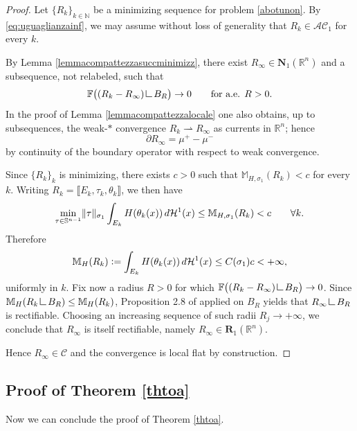 \documentclass{article}
\numberwithin{equation}{section}
\theoremstyle{plain}%
\theoremstyle{definition}
\theoremstyle{definition}
\newcommand{\rgrande}{\mathbb{R}}
\newcommand{\ngrande}{\mathbb{N}}
\newcommand{\haus}{\mathcal{H}}
\newcommand{\sfera}{\mathbb{S}}
\newcommand{\correttvar}[2]{\mathbf{R}_{#1}(\rgrande^{#2})}
\newcommand{\corrnormvar}[2]{\mathbf{N}_{#1}(\rgrande^{#2})}
\newcommand{\massa}{\mathbb{M}}
\newcommand{\massaanisotropauno}{\mathbb{M}_{H,\sigma_1}}
\newcommand{\mrestr}{\mathop{\hbox{\vrule height 7pt width 0.5pt depth 0pt
\vrule height 0.5pt width 6pt depth 0pt}}\nolimits}
\DeclarePairedDelimiter{\norma}{\lVert}{\rVert} %
\begin{document}
\begin{proof}
     Let $\{ R_k \}_{k \in \ngrande}$ be a minimizing sequence for problem \eqref{abotunon}. By \eqref{eq:uguaglianzainf}, we may assume without loss of generality that $R_k\in\mathcal{AC}_1$ for every $k$.

     By Lemma \ref{lemmacompattezzasuccminimizz}, there exist $R_{\infty} \in \corrnormvar{1}{n}$ and a subsequence, not relabeled, such that
     $$
     \mathbb F\bigl((R_k-R_\infty)\mrestr B_R\bigr)\to 0
     \qquad\text{for a.e. }R>0.
     $$
     In the proof of Lemma \ref{lemmacompattezzalocale} one also obtains, up to subsequences, the weak-$*$ convergence $R_k\rightharpoonup R_\infty$ as currents in $\rgrande^n$; hence
     $$
     \partial R_\infty=\mu^+-\mu^-
     $$
     by continuity of the boundary operator with respect to weak convergence.

     Since $\{R_k\}_k$ is minimizing, there exists $c>0$ such that $\massaanisotropauno(R_k)<c$ for every $k$. Writing $R_k=\llbracket E_k,\tau_k,\theta_k\rrbracket$, we then have
    \begin{equation}\label{eqstimahmassa}
    \min_{\tau\in\sfera^{n-1}} \norma{\tau}_{\sigma_1} \int_{E_k} H(\theta_k(x)) \,d \haus^1 (x) \leq \massaanisotropauno (R_k) < c
    \qquad
    \forall k
    \text{.}
    \end{equation}
    Therefore
    $$
    \massa_H (R_k) \vcentcolon =  \int_{E_k} H(\theta_k(x)) \,d \haus^1 (x) \leq C(\sigma_1)c < + \infty
    \text{,}
    $$
    uniformly in $k$. Fix now a radius $R>0$ for which $\mathbb F\bigl((R_k-R_\infty)\mrestr B_R\bigr)\to 0$. Since $\massa_H(R_k\mrestr B_R)\le \massa_H(R_k)$, Proposition 2.8 of \cite{cdrms17} applied on $B_R$ yields that $R_\infty\mrestr B_R$ is rectifiable. Choosing an increasing sequence of such radii $R_j\to +\infty$, we conclude that $R_\infty$ is itself rectifiable, namely $R_\infty\in\correttvar{1}{n}$.

    Hence $R_\infty\in\mathcal C$ and the convergence is local flat by construction.
\end{proof}

\subsection{Proof of Theorem \ref{thtoa}}
Now we can conclude the proof of Theorem \ref{thtoa}.
\end{document}
